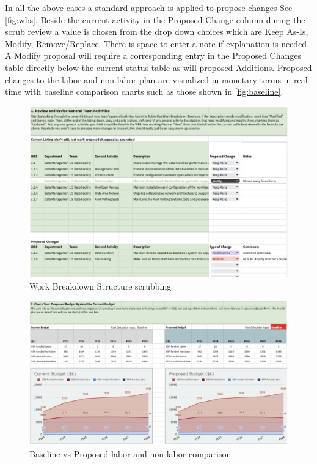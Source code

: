 In all the above cases a standard approach is applied to propose changes See \autoref{fig:wbs}. Beside the current activity in the Proposed Change column during the scrub review a value is chosen from the drop down choices which are Keep As-Is, Modify, Remove/Replace. There is space to enter a note if explanation is needed.
A Modify proposal will require a corresponding entry in the Proposed Changes table directly below the current status table as will proposed Additions.
Proposed changes to the labor and non-labor plan are visualized in monetary terms in real-time with baseline comparison charts such as those shown in \autoref{fig:baseline}.



\begin{figure}[h!]
\begin{centering}
\includegraphics[width=1.0\textwidth]{Figure4WorkBreakdownStructurescrubbing}
	\caption{ Work Breakdown Structure scrubbing
\label{fig:wbs}}
\end{centering}
\end{figure}

\begin{figure}[h!]
\begin{centering}
\includegraphics[width=1.0\textwidth]{Figure5BaselinevsProposed}
	\caption{Baseline vs Proposed labor and non-labor comparison
\label{fig:baseline}}
\end{centering}
\end{figure}
